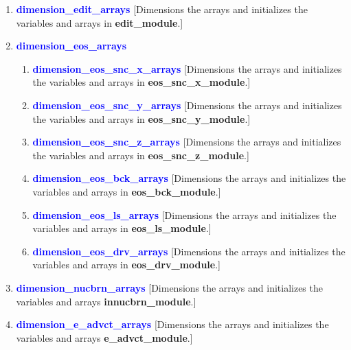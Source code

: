 \documentclass[11pt,doublespace]{article}
\begin{document}
\begin{itemize}
\begin{enumerate}
\begin{enumerate}
\begin{enumerate}
\begin{enumerate}
\end{enumerate}

  \item  \textcolor{blue}{ {\bf dimension\_edit\_arrays} }
  [Dimensions the arrays and initializes the variables and arrays in {\bf edit\_module}.]
  
  \item  \textcolor{blue}{ {\bf dimension\_eos\_arrays} }

\begin{enumerate}

  \item \textcolor{blue}{ {\bf dimension\_eos\_snc\_x\_arrays} }
  [Dimensions the arrays and initializes the variables and arrays in {\bf eos\_snc\_x\_module}.]

  \item \textcolor{blue}{ {\bf dimension\_eos\_snc\_y\_arrays} }
  [Dimensions the arrays and initializes the variables and arrays in {\bf eos\_snc\_y\_module}.]

  \item \textcolor{blue}{ {\bf dimension\_eos\_snc\_z\_arrays} }
  [Dimensions the arrays and initializes the variables and arrays in {\bf eos\_snc\_z\_module}.]

  \item \textcolor{blue}{ {\bf dimension\_eos\_bck\_arrays} }
  [Dimensions the arrays and initializes the variables and arrays in {\bf eos\_bck\_module}.]

  \item \textcolor{blue}{ {\bf dimension\_eos\_ls\_arrays} }
  [Dimensions the arrays and initializes the variables and arrays in {\bf eos\_ls\_module}.]

  \item \textcolor{blue}{ {\bf dimension\_eos\_drv\_arrays} }
  [Dimensions the arrays and initializes the variables and arrays in {\bf eos\_drv\_module}.]

\end{enumerate}

  \item  \textcolor{blue}{ {\bf dimension\_nucbrn\_arrays} }
  [Dimensions the arrays and initializes the variables and arrays {\bf innucbrn\_module}.]

  \item  \textcolor{blue}{ {\bf dimension\_e\_advct\_arrays} }
  [Dimensions the arrays and initializes the variables and arrays {\bf e\_advct\_module}.]

\end{enumerate}
  

\end{enumerate}
\end{enumerate}
\end{itemize}
\end{document}
